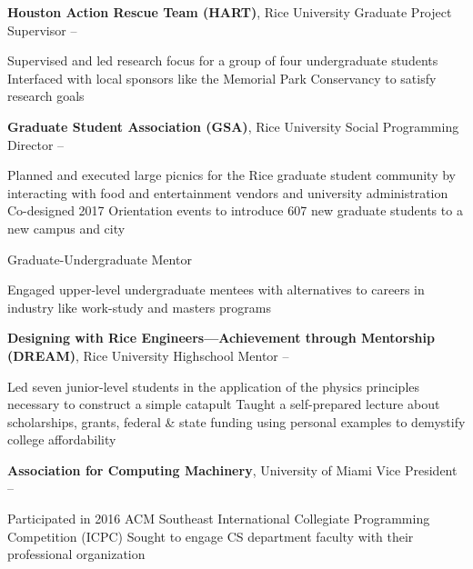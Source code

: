 \documentclass[letterpaper,MMMyyyy,nonstopmode]{simpleresumecv}
\begin{document}
\begin{Body}


\Entry
\textbf{Houston Action Rescue Team (HART)}, Rice University
\Gap
\BulletItem Graduate Project Supervisor
\hfill {} -- 
\begin{Detail}
\SubBulletItem Supervised and led research focus for a group of four undergraduate students
\SubBulletItem Interfaced with local sponsors like the Memorial Park Conservancy to satisfy research goals
\end{Detail}

\pagebreak

\Entry
\textbf{Graduate Student Association (GSA)}, Rice University
\Gap
\BulletItem Social Programming Director
\hfill {} -- 
\begin{Detail}
\SubBulletItem Planned and executed large picnics for the Rice graduate student community by interacting with food and entertainment vendors and university administration
\SubBulletItem Co-designed 2017 Orientation events to introduce 607 new graduate students to a new campus and city
\end{Detail}
\BulletItem Graduate-Undergraduate Mentor
\begin{Detail}
\SubBulletItem Engaged upper-level undergraduate mentees with alternatives to careers in industry like work-study and masters programs
\end{Detail}

\Entry
\textbf{Designing with Rice Engineers---Achievement through Mentorship (DREAM)}, Rice University
\Gap
\BulletItem Highschool Mentor
\hfill {} -- 
\begin{Detail}
\SubBulletItem Led seven junior-level students in the application of the physics principles necessary to construct a simple catapult
\SubBulletItem Taught a self-prepared lecture about scholarships, grants, federal \& state funding using personal examples to demystify college affordability
\end{Detail}

\Entry
\textbf{Association for Computing Machinery}, University of Miami
\Gap
\BulletItem Vice President
\hfill {} -- 
\begin{Detail}
\SubBulletItem Participated in 2016 ACM Southeast International Collegiate Programming Competition (ICPC)
\SubBulletItem Sought to engage CS department faculty with their professional organization
\end{Detail}


\end{Body}
\end{document}
